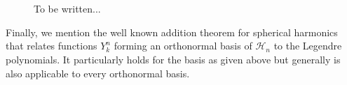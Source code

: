 \begin{figure}[htbp]
   \\
   \hfill
   \hfill
   \\
  \caption{To be written...}
\end{figure}

Finally, we mention the well known addition theorem for spherical harmonics 
that relates functions $Y_k^n$ forming an orthonormal basis of $\mathcal{H}_n$ 
to the Legendre polynomials. It particularly holds for the basis as given above but
generally is also applicable to every orthonormal basis.

